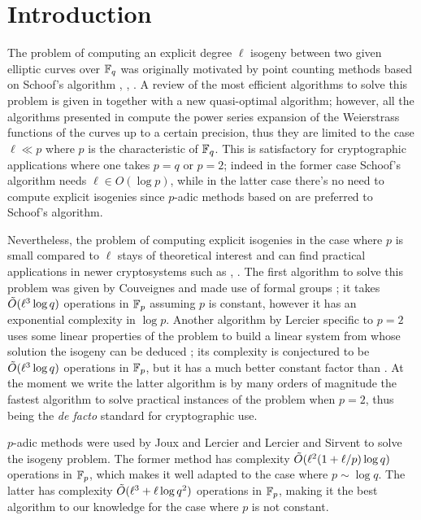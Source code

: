 \section{Introduction}

The problem of computing an explicit degree $\ell$ isogeny between two
given elliptic curves over $\mathbb{F}_q$ was originally motivated by point
counting methods based on Schoof's algorithm \cite{Atk91},
\cite{Elk91}, \cite{Sch95}. A review of the most efficient algorithms
to solve this problem is given in \cite{BoMoSaSc08} together with a
new quasi-optimal algorithm; however, all the algorithms presented in
\cite{BoMoSaSc08} compute the power series expansion of the
Weierstrass functions of the curves up to a certain precision, thus
they are limited to the case $\ell\ll p$ where $p$ is the
characteristic of $\mathbb{F}_q$. This is satisfactory for cryptographic
applications where one takes $p=q$ or $p=2$; indeed in the former case
Schoof's algorithm needs $\ell\in O(\log p)$, while in the latter case
there's no need to compute explicit isogenies since $p$-adic methods
based on \cite{Sat00} are preferred to Schoof's algorithm.

Nevertheless, the problem of computing explicit isogenies in the case
where $p$ is small compared to $\ell$ stays of theoretical interest
and can find practical applications in newer cryptosystems such as
\cite{Tes06}, \cite{RoSt06}. The first algorithm to solve this problem
was given by Couveignes and made use of formal groups \cite{Cou94}; it
takes $\tilde{O}(\ell^3\log q)$ operations in $\mathbb{F}_p$ assuming $p$ is
constant, however it has an exponential complexity in $\log
p$. Another algorithm by Lercier specific to $p=2$ uses some linear
properties of the problem to build a linear system from whose solution
the isogeny can be deduced \cite{Ler96}; its complexity is conjectured
to be $\tilde{O}(\ell^3\log q)$ operations in $\mathbb{F}_p$, but it has a much
better constant factor than \cite{Cou94}. At the moment we write the
latter algorithm is by many orders of magnitude the fastest algorithm
to solve practical instances of the problem when $p=2$, thus being the
\emph{de facto} standard for cryptographic use.

$p$-adic methods were used by Joux and Lercier \cite{JL06} and Lercier
and Sirvent \cite{LeSi09} to solve the isogeny problem. The former
method has complexity $\tilde{O}(\ell^2(1 + \ell/p)\log q)$ operations in
$\mathbb{F}_p$, which makes it well adapted to the case where $p\sim\log
q$. The latter has complexity $\tilde{O}(\ell^3 + \ell\log q^2)$
operations in $\mathbb{F}_p$, making it the best algorithm to our knowledge
for the case where $p$ is not constant.

